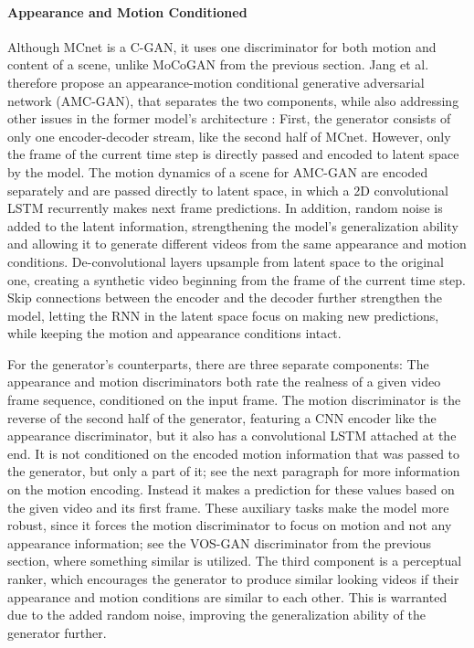 \paragraph{Appearance and Motion Conditioned} 
Although MCnet is a C-GAN, it uses one discriminator for both motion and content of a scene, unlike MoCoGAN from the previous section. Jang et al. therefore propose an appearance-motion conditional generative adversarial network (AMC-GAN), that separates the two components, while also addressing other issues in the former model's architecture \cite{jang2018video}: First, the generator consists of only one encoder-decoder stream, like the second half of MCnet. However, only the frame of the current time step is directly passed and encoded to latent space by the model. The motion dynamics of a scene for AMC-GAN are encoded separately and are passed directly to latent space, in which a 2D convolutional LSTM recurrently makes next frame predictions. In addition, random noise is added to the latent information, strengthening the model's generalization ability and allowing it to generate different videos from the same appearance and motion conditions. De-convolutional layers upsample from latent space to the original one, creating a synthetic video beginning from the frame of the current time step. Skip connections between the encoder and the decoder further strengthen the model, letting the RNN in the latent space focus on making new predictions, while keeping the motion and appearance conditions intact. 

For the generator's counterparts, there are three separate components: The appearance and motion discriminators both rate the realness of a given video frame sequence, conditioned on the input frame. The motion discriminator is the reverse of the second half of the generator, featuring a CNN encoder like the appearance discriminator, but it also has a convolutional LSTM attached at the end. It is not conditioned on the encoded motion information that was passed to the generator, but only a part of it; see the next paragraph for more information on the motion encoding. Instead it makes a prediction for these values based on the given video and its first frame. These auxiliary tasks make the model more robust, since it forces the motion discriminator to focus on motion and not any appearance information; see the VOS-GAN discriminator from the previous section, where something similar is utilized. The third component is a perceptual ranker, which encourages the generator to produce similar looking videos if their appearance and motion conditions are similar to each other. This is warranted due to the added random noise, improving the generalization ability of the generator further.

